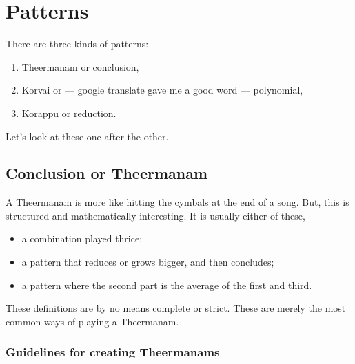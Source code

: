 \chapter{Patterns}

There are three kinds of patterns:
\begin{enumerate}
  \item Theermanam or conclusion,
  \item Korvai or --- google translate gave me a good word --- polynomial,
  \item Korappu or reduction.
\end{enumerate}
Let's look at these one after the other.

\section{Conclusion or Theermanam}

A Theermanam is more like hitting the cymbals at the end of a song. But, this is
structured and mathematically interesting. It is usually either of these,
\begin{itemize}
  \item a combination played thrice;
  \item a pattern that reduces or grows bigger, and then concludes;
  \item a pattern where the second part is the average of the first and third.
\end{itemize}
These definitions are by no means complete or strict. These are merely the most
common ways of playing a Theermanam.

\subsection{Guidelines for creating Theermanams}

